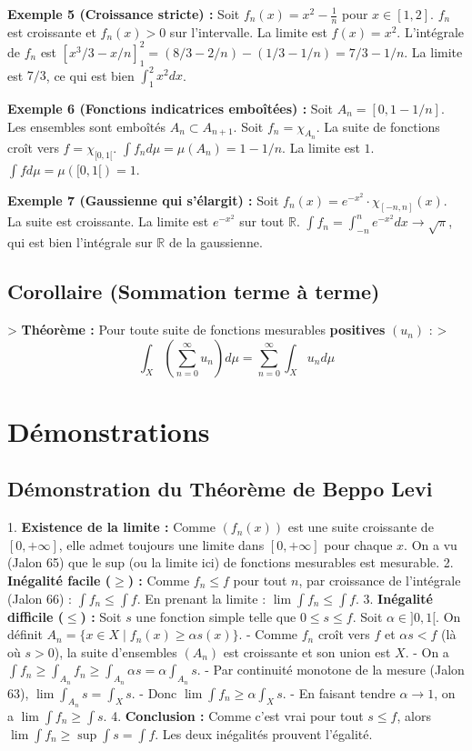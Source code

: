 \documentclass[11pt,a4paper]{article}
\begin{document}
\textbf{Exemple 5 (Croissance stricte) :}
Soit $f_n(x) = x^2 - \frac{1}{n}$ pour $x \in [1,2]$. $f_n$ est croissante et $f_n(x) > 0$ sur l'intervalle.
La limite est $f(x) = x^2$. L'intégrale de $f_n$ est $[x^3/3 - x/n]_1^2 = (8/3 - 2/n) - (1/3 - 1/n) = 7/3 - 1/n$.
La limite est $7/3$, ce qui est bien $\int_1^2 x^2 dx$.

\textbf{Exemple 6 (Fonctions indicatrices emboîtées) :}
Soit $A_n = [0, 1 - 1/n]$. Les ensembles sont emboîtés $A_n \subset A_{n+1}$.
Soit $f_n = \chi_{A_n}$. La suite de fonctions croît vers $f = \chi_{[0,1[}$.
$\int f_n d\mu = \mu(A_n) = 1 - 1/n$. La limite est $1$. $\int f d\mu = \mu([0,1[) = 1$.

\textbf{Exemple 7 (Gaussienne qui s'élargit) :}
Soit $f_n(x) = e^{-x^2} \cdot \chi_{[-n,n]}(x)$. La suite est croissante.
La limite est $e^{-x^2}$ sur tout $\mathbb{R}$.
$\int f_n = \int_{-n}^n e^{-x^2} dx \to \sqrt{\pi}$, qui est bien l'intégrale sur $\mathbb{R}$ de la gaussienne.

\subsection{Corollaire (Sommation terme à terme)}

> \textbf{Théorème :} Pour toute suite de fonctions mesurables \textbf{positives} $(u_n)$ :
> $$\int_X \left( \sum_{n=0}^\infty u_n \right) d\mu = \sum_{n=0}^\infty \int_X u_n d\mu$$

\section{Démonstrations}

\subsection{Démonstration du Théorème de Beppo Levi}

1. \textbf{Existence de la limite :} Comme $(f_n(x))$ est une suite croissante de $[0, +\infty]$, elle admet toujours une limite dans $[0, +\infty]$ pour chaque $x$. On a vu (Jalon 65) que le sup (ou la limite ici) de fonctions mesurables est mesurable.
2. \textbf{Inégalité facile ($\ge$) :} Comme $f_n \le f$ pour tout $n$, par croissance de l'intégrale (Jalon 66) :
   $\int f_n \le \int f$. En prenant la limite : $\lim \int f_n \le \int f$.
3. \textbf{Inégalité difficile ($\le$) :} Soit $s$ une fonction simple telle que $0 \le s \le f$. Soit $\alpha \in ]0, 1[$.
   On définit $A_n = \{x \in X \mid f_n(x) \ge \alpha s(x) \}$.
   - Comme $f_n$ croît vers $f$ et $\alpha s < f$ (là où $s>0$), la suite d'ensembles $(A_n)$ est croissante et son union est $X$.
   - On a $\int f_n \ge \int_{A_n} f_n \ge \int_{A_n} \alpha s = \alpha \int_{A_n} s$.
   - Par continuité monotone de la mesure (Jalon 63), $\lim \int_{A_n} s = \int_X s$.
   - Donc $\lim \int f_n \ge \alpha \int_X s$.
   - En faisant tendre $\alpha \to 1$, on a $\lim \int f_n \ge \int s$.
4. \textbf{Conclusion :} Comme c'est vrai pour tout $s \le f$, alors $\lim \int f_n \ge \sup \int s = \int f$.
   Les deux inégalités prouvent l'égalité.
\end{document}
